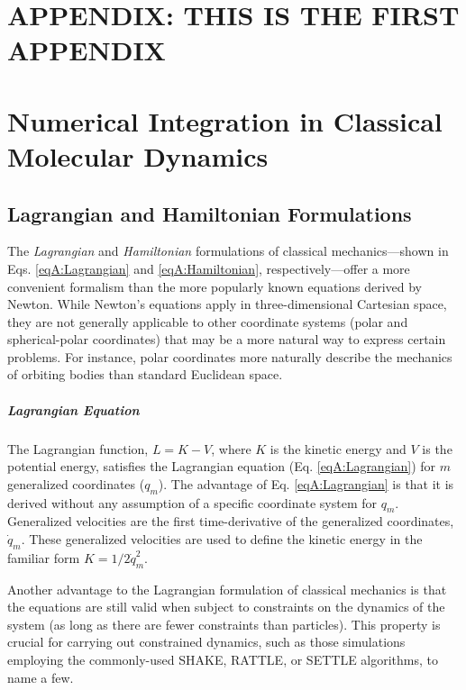 {\chapter*{APPENDIX: THIS IS THE FIRST APPENDIX}
\setcounter{chapter}{1}}
{\chapter{Numerical Integration in Classical Molecular Dynamics}}
\label{appendixA}

\section{Lagrangian and Hamiltonian Formulations}

The \emph{Lagrangian} and \emph{Hamiltonian} formulations of classical
mechanics---shown in Eqs. \ref{eqA:Lagrangian} and \ref{eqA:Hamiltonian},
respectively---offer a more convenient formalism than the more popularly known
equations derived by Newton. \cite{CorbenClassicalMechanics} While Newton's
equations apply in three-dimensional Cartesian space, they are not generally
applicable to other coordinate systems (\eg polar and spherical-polar
coordinates) that may be a more natural way to express certain problems. For
instance, polar coordinates more naturally describe the mechanics of orbiting
bodies than standard Euclidean space.

\paragraph{Lagrangian Equation}

The Lagrangian function, $L = K - V$, where $K$ is the kinetic energy and $V$ is
the potential energy, satisfies the Lagrangian equation (Eq.
\ref{eqA:Lagrangian}) for $m$ generalized coordinates ($q_m$). The advantage of
Eq. \ref{eqA:Lagrangian} is that it is derived without any assumption of a
specific coordinate system for $q_m$. Generalized velocities are the first
time-derivative of the generalized coordinates, $\dot q_m$. These generalized
velocities are used to define the kinetic energy in the familiar form $K = 1/2
\dot q_m ^ 2$.

Another advantage to the Lagrangian formulation of classical mechanics is that
the equations are still valid when subject to constraints on the dynamics of the
system (as long as there are fewer constraints than particles).
\cite{CorbenClassicalMechanics} This property is crucial for carrying out
constrained dynamics, such as those simulations employing the commonly-used
SHAKE, \cite{Ryckaert_JComputPhys_1977_v23_p327} RATTLE, \cite{Andersen1983} or
SETTLE \cite{Miyamoto_JComputChem_1992_v13_p952} algorithms, to name a few.

